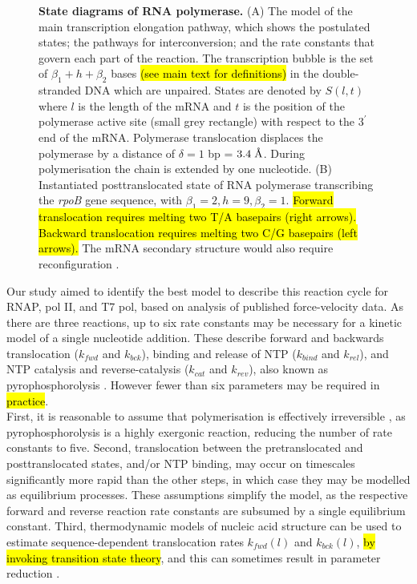\documentclass[10pt,letterpaper]{article}
\newcommand{\angstrom}{\mbox{\normalfont\AA}}
\begin{document}
\begin{figure}[!h]
\caption{\textbf{ State diagrams of RNA polymerase.}
(A) The model of the main transcription elongation pathway, which shows the postulated states; the pathways for interconversion; and the rate constants that govern each part of the reaction. The transcription bubble is the set of $\beta_1 + h + \beta_2$ bases \hl{(see main text for definitions)} in the double-stranded DNA which are unpaired. States are denoted by $S(l, t)$ where $l$ is the length of the mRNA and $t$ is the position of the polymerase active site (small grey rectangle) with respect to the $3^\prime$ end of the mRNA.  Polymerase translocation displaces the polymerase by a distance of $\delta = 1$ bp = $3.4\; \angstrom$. During polymerisation the chain is extended by one nucleotide. (B) Instantiated posttranslocated state of RNA polymerase transcribing the \textit{rpoB} gene sequence, with $\beta_1 = 2, h = 9, \beta_2 = 1$. \hl{Forward translocation requires melting two T/A basepairs (right arrows). Backward translocation requires melting two C/G basepairs (left arrows).} The mRNA secondary structure would also require reconfiguration \cite{tadigotla2006thermodynamic, maoileidigh2011unified}.}
\label{fig2}
\end{figure}




Our study aimed to identify the best model to describe this reaction cycle for RNAP, pol II, and T7 pol, based on analysis of published force-velocity data. As there are three reactions, up to six rate constants may be necessary for a kinetic model of a single nucleotide addition. These describe forward and backwards translocation ($k_{fwd}$ and $k_{bck}$), binding and release of NTP ($k_{bind}$ and $k_{rel}$), and NTP catalysis and reverse-catalysis ($k_{cat}$ and $k_{rev}$), also known as pyrophosphorolysis \cite{maitra1967role}. However fewer than six parameters may be required in \hl{practice}. \\


First, it is reasonable to assume that polymerisation is effectively irreversible  \cite{erie1992single, rhodes1974ribonucleic, maoileidigh2011unified, bai2004sequence}, as pyrophosphorolysis is a highly exergonic reaction, reducing the number of rate constants to five.
Second, translocation between the pretranslocated and posttranslocated states, and/or NTP binding, may occur on timescales significantly more rapid than the other steps, in which case they may be modelled as equilibrium processes. These assumptions simplify the model, as the respective forward and reverse reaction rate constants are subsumed by a single equilibrium constant. Third, thermodynamic models of nucleic acid structure can be used to estimate sequence-dependent translocation rates $k_{fwd}(l)$ and $k_{bck}(l)$, \hl{by invoking transition state theory}, and this can sometimes result in parameter reduction \cite{tadigotla2006thermodynamic, maoileidigh2011unified, bai2004sequence}. \\
\end{document}
